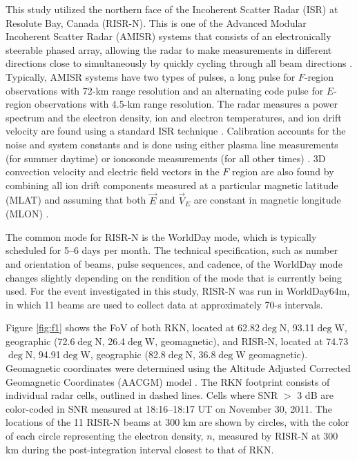 This study utilized the northern face of the Incoherent Scatter Radar (ISR) at Resolute Bay, Canada (RISR-N).  This is one of the Advanced Modular Incoherent Scatter Radar (AMISR) systems that consists of an electronically steerable phased array, allowing the radar to make measurements in different directions close to simultaneously by quickly cycling through all beam directions \citep{Bahcivan2010}.  Typically, AMISR systems have two types of pulses, a long pulse for \(F\)-region observations with 72-km range resolution and an alternating code pulse for \(E\)-region observations with 4.5-km range resolution.  The radar measures a power spectrum and the electron density, ion and electron temperatures, and ion drift velocity are found using a standard ISR technique \citep{Evans1969,Risbeth1985,Nicolls2007}.  Calibration accounts for the noise and system constants \citep{Nicolls2007} and is done using either plasma line measurements (for summer daytime) or ionosonde measurements (for all other times) \citep{Bahcivan2010,Themens2014a}.  3D convection velocity and electric field vectors in the $F$ region are also found by combining all ion drift components measured at a particular magnetic latitude (MLAT) and assuming that both \(\vec{E}\) and \(\vec{V}_E\) are constant in magnetic longitude (MLON) \citep{Heinselman2008}.

The common mode for RISR-N is the WorldDay mode, which is typically scheduled for 5--6 days per month.  The technical specification, such as number and orientation of beams, pulse sequences, and cadence, of the WorldDay mode changes slightly depending on the rendition of the mode that is currently being used.  For the event investigated in this study, RISR-N was run in WorldDay64m, in which 11 beams are used to collect data at approximately 70-s intervals.

Figure \ref{fig:f1} shows the FoV of both RKN, located at 62.82\(\deg\)N, 93.11\(\deg\)W, geographic (72.6\(\deg\)N, 26.4\(\deg\)W, geomagnetic), and RISR-N, located at 74.73\(\deg\)N, 94.91\(\deg\)W, geographic (82.8\(\deg\)N, 36.8\(\deg\)W geomagnetic).  Geomagnetic coordinates were determined using the Altitude Adjusted Corrected Geomagnetic Coordinates (AACGM) model \citep{Shepard2014}.  The RKN footprint consists of individual radar cells, outlined in dashed lines.  Cells where SNR \(>\) 3 dB are color-coded in SNR measured at 18:16--18:17 UT on November 30, 2011. The locations of the 11 RISR-N beams at 300 km are shown by circles, with the color of each circle representing the electron density, \(n\), measured by RISR-N at 300 km during the post-integration interval closest to that of RKN.

